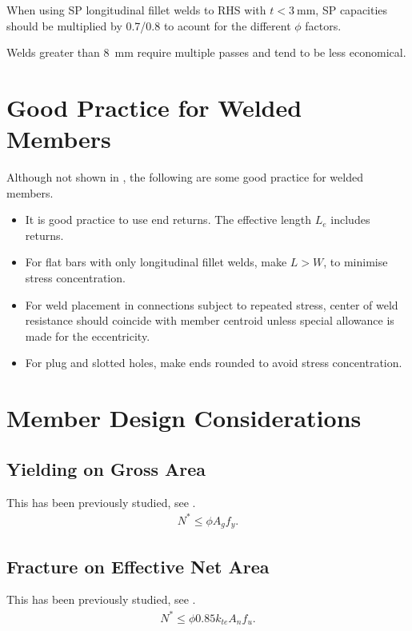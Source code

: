 When using SP longitudinal fillet welds to RHS with $t<\SI{3}{\mm}$, SP capacities should be multiplied by \num{0.7}/\num{0.8} to acount for the different $\phi$ factors.

Welds greater than \SI{8}{\mm} require multiple passes and tend to be less economical.
\section{Good Practice for Welded Members}
Although not shown in \NZSSTEEL{}, the following are some good practice for welded members.
\begin{itemize}
\item It is good practice to use end returns. The effective length $L_e$ includes returns.
\begin{figure}[H]
\centering
\end{figure}
\item For flat bars with only longitudinal fillet welds, make $L>W$, to minimise stress concentration.
\begin{figure}[H]
\centering
\end{figure}
\item For weld placement in connections subject to repeated stress, center of weld resistance should coincide with member centroid unless special allowance is made for the eccentricity.
\begin{figure}[H]
\centering
\end{figure}
\item For plug and slotted holes, make ends rounded to avoid stress concentration.
\begin{figure}[H]
\centering
\end{figure}
\end{itemize}
\section{Member Design Considerations}
\subsection{Yielding on Gross Area}
This has been previously studied, see .
\begin{gather}
N^*\leqslant\phi{}A_gf_y.
\end{gather}
\subsection{Fracture on Effective Net Area}
This has been previously studied, see .
\begin{gather}
N^*\leqslant\phi0.85k_{te}A_nf_u.
\end{gather}
